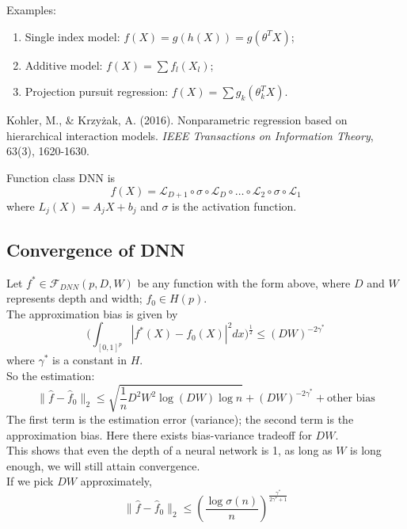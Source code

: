 \documentclass[12pt]{book}
\theoremstyle{definition}
\theoremstyle{remark}
\begin{document}
Examples:
\begin{enumerate}
    \item Single index model: $f(X) = g(h(X)) = g(\theta^TX)$;
    \item Additive model: $f(X) = \sum f_l(X_l)$;
    \item Projection pursuit regression: $f(X) = \sum g_k(\theta_k^TX)$.
\end{enumerate}

\begin{referencebox}
    Kohler, M., \& Krzyżak, A. (2016). Nonparametric regression based on hierarchical interaction models. \textit{IEEE Transactions on Information Theory}, 63(3), 1620-1630.
\end{referencebox}


Function class DNN is  
\[f(X) = \mathcal{L}_{D+1} \circ \sigma \circ \mathcal{L}_D \circ \dots \circ \mathcal{L}_2 \circ \sigma \circ \mathcal{L}_1\]
where $L_j(X) = A_jX+b_j$ and $\sigma$ is the activation function.


\subsection{Convergence of DNN}
Let $f^* \in \mathcal{F}_{DNN} (p,D,W)$ be any function with the form above, where $D$ and $W$ represents depth and width; $f_0 \in H(p)$.\\

The approximation bias is given by
\[\big(\int_{[0,1]^p}|f^*(X) - f_0(X)|^2dx\big)^{\frac12}\le (DW)^{-2\gamma^*}\] where $\gamma^*$ is a constant in $H$.\\

So the estimation:
\[\|\hat{f}-\hat{f}_0\|_2 \le \sqrt{\frac1n D^2W^2\log(DW) \log n}+ (DW)^{-2\gamma^*} + \text{other bias}\]
The first term is the estimation error (variance); the second term is the approximation bias. Here there exists bias-variance tradeoff for $DW$.\\

This shows that even the depth of a neural network is 1, as long as $W$ is long enough, we will still attain convergence.\\

If we pick $DW$ approximately, 
\[\|\hat{f} - \hat{f}_0\|_2 \le (\frac{\log \sigma(n)}{n})^{\frac{\gamma^*}{2\gamma^*+1}}\]
\end{document}
